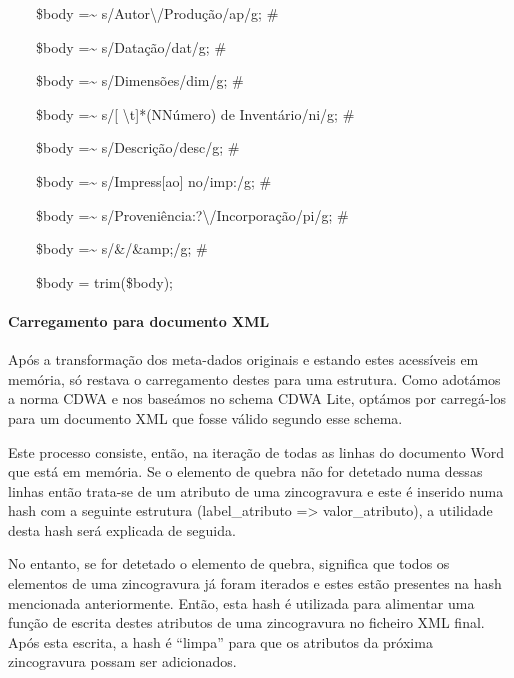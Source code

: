 \documentclass[letterpaper]{article}
\begin{document}
{
\ \ \ \ \$body =\~{} s/Autor{\textbackslash}/Produ\c{c}\~ao/ap/g; \# }

{
\ \ \ \ \$body =\~{} s/Data\c{c}\~ao/dat/g; \# }

{
\ \ \ \ \$body =\~{} s/Dimens\~oes/dim/g; \# }

{
\ \ \ \ \$body =\~{} s/[
{\textbackslash}t]*(N{\textordmasculine}{\textbar}N\'umero) de
Invent\'ario/ni/g; \# }

{
\ \ \ \ \$body =\~{} s/Descri\c{c}\~ao/desc/g; \# }

{
\ \ \ \ \$body =\~{} s/Impress[ao] no/imp:/g; \# }

{
\ \ \ \ \$body =\~{}
s/Proveni\^encia:?{\textbackslash}/Incorpora\c{c}\~ao/pi/g; \# }

{
\ \ \ \ \$body =\~{} s/\&/\&amp;/g; \# }


\bigskip

{
\ \ \ \ \$body = trim(\$body); }

\paragraph[Carregamento para documento XML]{
Carregamento para documento XML}
{
Ap\'os a transforma\c{c}\~ao dos meta-dados originais e estando estes
acess\'iveis em mem\'oria, s\'o restava o carregamento destes para uma
estrutura. Como adot\'amos a norma CDWA e nos base\'amos no schema CDWA
Lite, opt\'amos por carreg\'a-los para um documento XML que fosse
v\'alido segundo esse schema.}

{
Este processo consiste, ent\~ao, na itera\c{c}\~ao de todas as linhas do
documento Word que est\'a em mem\'oria. Se o elemento de quebra n\~ao
for detetado numa dessas linhas ent\~ao trata-se de um atributo de uma
zincogravura e este \'e inserido numa hash com a seguinte estrutura
(label\_atributo ={\textgreater} valor\_atributo), a utilidade desta
hash ser\'a explicada de seguida.}

{
No entanto, se for detetado o elemento de quebra, significa que todos os
elementos de uma zincogravura j\'a foram iterados e estes est\~ao
presentes na hash mencionada anteriormente. Ent\~ao, esta hash \'e
utilizada para alimentar uma fun\c{c}\~ao de escrita destes atributos
de uma zincogravura no ficheiro XML final. Ap\'os esta escrita, a hash
\'e {\textquotedblleft}limpa{\textquotedblright} para que os atributos
da pr\'oxima zincogravura possam ser adicionados.}
\end{document}
